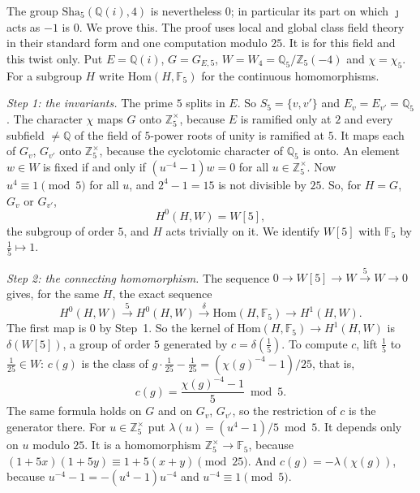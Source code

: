 \documentclass[11pt,letterpaper]{article}
\newcommand{\Z}{\mathbb Z}\newcommand{\Q}{\mathbb Q}\newcommand{\C}{\mathbb C}
\begin{document}
The group $\mathrm{Sha}_5(\Q(i),4)$ is nevertheless $0$; in particular its part on which $\jmath$ acts as
$-1$ is $0$. We prove this. The proof uses local and global class field theory in their standard form and
one computation modulo $25$. It is for this field and this twist only. Put $E=\Q(i)$, $G=G_{E,5}$,
$W=W_4=\Q_5/\Z_5(-4)$ and $\chi=\chi_5$. For a subgroup $H$ write $\mathrm{Hom}(H,\mathbb F_5)$ for the continuous
homomorphisms.

\emph{Step 1: the invariants.} The prime $5$ splits in $E$. So $S_5=\{v,v'\}$ and $E_v=E_{v'}=\Q_5$. The
character $\chi$ maps $G$ onto $\Z_5^\times$, because $E$ is ramified only at $2$ and every subfield
$\ne\Q$ of the field of $5$-power roots of unity is ramified at $5$. It maps each of $G_v$, $G_{v'}$ onto
$\Z_5^\times$, because the cyclotomic character of $\Q_5$ is onto. An element $w\in W$ is fixed if and only
if $(u^{-4}-1)w=0$ for all $u\in\Z_5^\times$. Now $u^{4}\equiv1\pmod5$ for all $u$, and $2^4-1=15$ is not
divisible by $25$. So, for $H=G$, $G_v$ or $G_{v'}$,
\begin{equation}\label{D:346}
 H^0(H,W)=W[5],
\end{equation}
the subgroup of order $5$, and $H$ acts trivially on it. We identify $W[5]$ with $\mathbb F_5$ by $\frac15\mapsto1$.

\emph{Step 2: the connecting homomorphism.} The sequence $0\to W[5]\to W\xrightarrow{\,5\,}W\to0$ gives, for
the same $H$, the exact sequence
\begin{equation}\label{D:347}
 H^0(H,W)\xrightarrow{\ 5\ }H^0(H,W)\xrightarrow{\ \delta\ }\mathrm{Hom}(H,\mathbb F_5)\longrightarrow H^1(H,W) .
\end{equation}
The first map is $0$ by Step~1. So the kernel of $\mathrm{Hom}(H,\mathbb F_5)\to H^1(H,W)$ is $\delta(W[5])$, a
group of order $5$ generated by $c=\delta(\frac15)$. To compute $c$, lift $\frac15$ to $\frac1{25}\in W$:
$c(g)$ is the class of $g\cdot\frac1{25}-\frac1{25}=(\chi(g)^{-4}-1)/25$, that is,
\begin{equation}\label{D:348}
 c(g)=\frac{\chi(g)^{-4}-1}{5}\bmod 5 .
\end{equation}
The same formula holds on $G$ and on $G_v$, $G_{v'}$, so the restriction of $c$ is the generator there. For
$u\in\Z_5^\times$ put $\lambda(u)=(u^{4}-1)/5\bmod5$. It depends only on $u$ modulo $25$. It is a
homomorphism $\Z_5^\times\to\mathbb F_5$, because $(1+5x)(1+5y)\equiv1+5(x+y)\pmod{25}$. And
$c(g)=-\lambda(\chi(g))$, because $u^{-4}-1=-(u^4-1)u^{-4}$ and $u^{-4}\equiv1\pmod5$.
\end{document}
